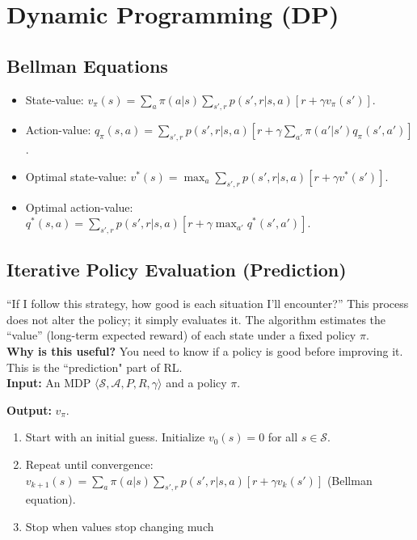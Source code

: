 \documentclass[12pt]{article}
\begin{document}
\section{Dynamic Programming (DP) }

\subsection{Bellman Equations}
\begin{itemize}
    \item State-value: $v_\pi(s) = \sum_a \pi(a|s) \sum_{s',r} p(s',r|s,a) [r + \gamma v_\pi(s')]$.
    \item Action-value: $q_\pi(s,a) = \sum_{s',r} p(s',r|s,a) [r + \gamma \sum_{a'} \pi(a'|s') q_\pi(s',a')]$.
    \item Optimal state-value: $v^*(s) = \max_a \sum_{s',r} p(s',r|s,a) [r + \gamma v^*(s')]$.
    \item Optimal action-value: $q^*(s,a) = \sum_{s',r} p(s',r|s,a) [r + \gamma \max_{a'} q^*(s',a')]$.
\end{itemize}

\subsection{Iterative Policy Evaluation (Prediction)}
``If I follow this strategy, how good is each situation I'll encounter?'' This process does not alter the policy; it simply evaluates it. The algorithm estimates the ``value'' (long-term expected reward) of each state under a fixed policy $\pi$.\\

\textbf{Why is this useful?} You need to know if a policy is good before improving it. This is the ``prediction" part of RL.\\

\textbf{Input:} An MDP $\langle \mathcal{S}, \mathcal{A}, P, R, \gamma \rangle$ and a policy $\pi$.

\textbf{Output:} $v_\pi$.
\begin{enumerate}
    \item Start with an initial guess. Initialize $v_0(s) = 0$ for all $s \in \mathcal{S}$.
    \item Repeat until convergence:
    $v_{k+1}(s) = \sum_a \pi(a|s) \sum_{s',r} p(s',r|s,a) [r + \gamma v_k(s')]$ (Bellman equation).
    \item Stop when values stop changing much
\end{enumerate}
\end{document}
